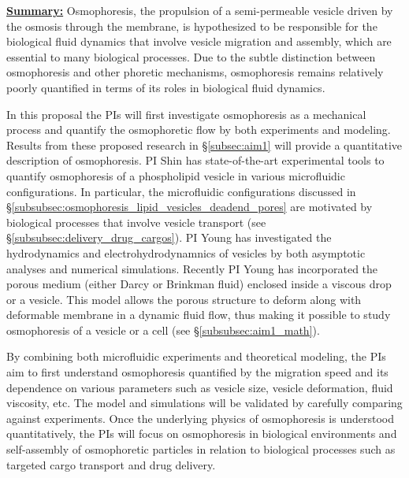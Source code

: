 \documentclass[11pt]{article}
\begin{document}
\noindent
\underline{{\bf Summary:}}
Osmophoresis, the propulsion of a semi-permeable vesicle driven by the osmosis through the membrane, 
is hypothesized to be responsible for the biological fluid dynamics that involve vesicle migration and assembly, which are essential to many biological processes.
Due to the subtle distinction between osmophoresis and other phoretic mechanisms, osmophoresis remains relatively poorly quantified in terms of its
roles in biological fluid dynamics. 

In this proposal the PIs will first investigate osmophoresis as a mechanical process and quantify the osmophoretic flow by both experiments and modeling.
Results from these proposed research in \S\ref{subsec:aim1} will provide a quantitative description of osmophoresis. 
PI Shin has state-of-the-art experimental tools to quantify osmophoresis of a phospholipid vesicle in various microfluidic configurations. 
In particular, the microfluidic configurations discussed in \S\ref{subsubsec:osmophoresis_lipid_vesicles_deadend_pores} are motivated by biological processes that
involve vesicle transport (see \S\ref{subsubsec:delivery_drug_cargos}). 
PI Young has investigated the hydrodynamics and electrohydrodynamnics of vesicles by both
asymptotic analyses and numerical simulations. Recently PI Young has incorporated the porous medium (either Darcy or Brinkman fluid) enclosed inside a viscous drop or a vesicle.
This model allows the porous structure to deform along with deformable membrane in a dynamic fluid flow, thus making it possible to study osmophoresis of a vesicle or a cell 
(see \S\ref{subsubsec:aim1_math}). 

By combining both microfluidic experiments and theoretical modeling, the PIs aim to first understand osmophoresis quantified by the migration speed and its dependence
on various parameters such as vesicle size, vesicle deformation, fluid viscosity, etc. The model and simulations will be validated by carefully comparing against experiments.
Once the underlying physics of osmophoresis is understood quantitatively, the PIs will focus on osmophoresis in biological environments and self-assembly of osmophoretic
particles in relation to biological processes such as targeted cargo transport and drug delivery.


\end{document}
